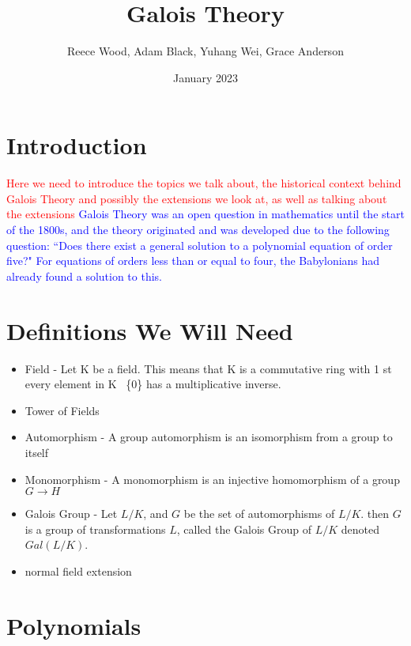 \documentclass[12pt]{article}
\title{\textbf{Galois Theory}}
\author{Reece Wood, Adam Black, Yuhang Wei, Grace Anderson}
\date{January 2023}
\begin{document}
\maketitle

\tableofcontents

\newpage
\section{Introduction}
\textcolor{red}{Here we need to introduce the topics we talk about, the
    historical context behind Galois Theory and possibly the extensions we look
    at,
    as well as talking about the extensions}
\textcolor{blue}{Galois Theory was an open question in mathematics until the
    start of the 1800s, and the theory originated and was developed due to the
    following question: ``Does there exist a general solution to a polynomial
    equation of order five?"  For equations of orders less than or equal to
    four,
    the Babylonians had already found a solution to this.}
\section{Definitions We Will Need}
\begin{itemize}
    \item Field - Let K be a field. This means that K is a commutative ring
          with 1 st every element in K \ \{0\} has a multiplicative inverse.
    \item Tower of Fields
    \item Automorphism - A group automorphism is an isomorphism from a group to
          itself
    \item Monomorphism - A monomorphism is an injective homomorphism of a group
          $G \rightarrow{} H$
    \item Galois Group - Let $L/K$, and $G$ be the set of automorphisms of
          $L/K$. then $G$ is a group of transformations $L$, called the Galois
          Group of
          $L/K$ denoted $Gal(L/K)$.
    \item normal field extension
\end{itemize}
\section{Polynomials}
\end{document}
